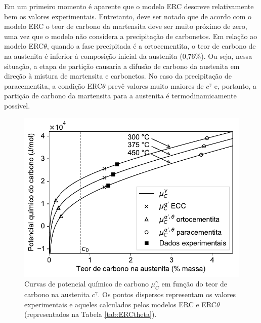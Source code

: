 Em um primeiro momento é aparente que o modelo ERC descreve relativamente bem os valores experimentais. Entretanto, deve ser notado que de acordo com o modelo ERC o teor de carbono da martensita deve ser muito próximo de zero, uma vez que o modelo não considera a precipitação de carbonetos. Em relação ao modelo ERC$\theta$, quando a fase precipitada é a ortocementita, o teor de carbono de na austenita é inferior à composição inicial da austenita (0,76\%). Ou seja, nessa situação, a etapa de partição causaria a difusão de carbono da austenita em direção à mistura de martensita e carbonetos. No caso da precipitação de paracementita, a condição ERC$\theta$ prevê valores muito maiores de $c^\gamma$ e, portanto, a partição de carbono da martensita para a austenita é termodinamicamente possível.

\begin{figure}
  \centering  
  \includegraphics[width=.8\textwidth]{img/thermo-calc/CCE.pdf}
  \caption{Curvas de potencial químico de carbono $\mu_C^\gamma$ em função do teor de carbono na austenita $c^\gamma$. Os pontos dispersos representam os valores experimentais e aqueles calculados pelos modelos ERC e ERC$\theta$ (representados na Tabela \ref{tab:ERCtheta}).}
  \label{fig:ERC_chempot}
\end{figure}

